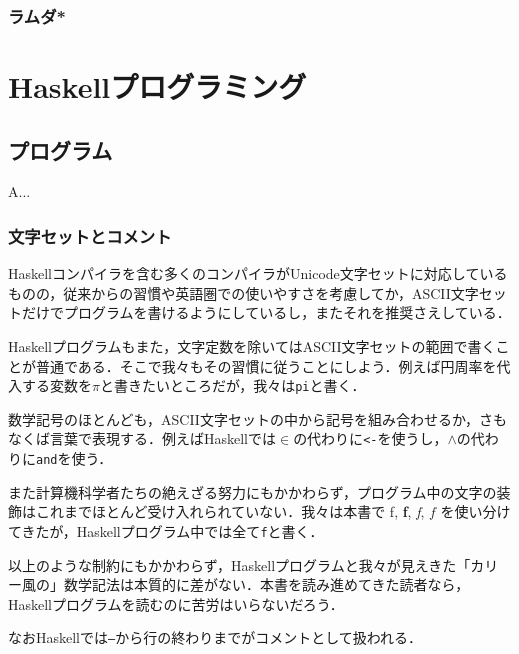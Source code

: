 \documentclass[a4paper,draft]{jsbook}
\newcommand{\programminglanguage}[1]{\textsf{#1}}
\newcommand{\haskell}{\programminglanguage{Haskell}}
\newenvironment{leader}{\begingroup}{\endgroup}
\newcommand{\code}[1]{\texttt{#1}}
\begin{document}

\section{ラムダ*}

\part{\haskell プログラミング}

\chapter{プログラム}

\begin{leader}
A...
\end{leader}


\section{文字セットとコメント}

\haskell コンパイラを含む多くのコンパイラがUnicode文字セットに対応しているものの，従来からの習慣や英語圏での使いやすさを考慮してか，ASCII文字セットだけでプログラムを書けるようにしているし，またそれを推奨さえしている．

\haskell プログラムもまた，文字定数を除いてはASCII文字セットの範囲で書くことが普通である．そこで我々もその習慣に従うことにしよう．例えば円周率を代入する変数を$\pi$と書きたいところだが，我々は\code{pi}と書く．

数学記号のほとんども，ASCII文字セットの中から記号を組み合わせるか，さもなくば言葉で表現する．例えば\haskell では$\in$の代わりに\code{<-}を使うし，$\wedge$の代わりに\code{and}を使う．

また計算機科学者たちの絶えざる努力にもかかわらず，プログラム中の文字の装飾はこれまでほとんど受け入れられていない．我々は本書で \textrm{f}, \textbf{f}, \textit{f}, $f$ を使い分けてきたが，\haskell プログラム中では全て\code{f}と書く．

以上のような制約にもかかわらず，\haskell プログラムと我々が見えきた「カリー風の」数学記法は本質的に差がない．本書を読み進めてきた読者なら，\haskell プログラムを読むのに苦労はいらないだろう．

なお\haskell では\code{--}から行の終わりまでがコメントとして扱われる．
\end{document}
